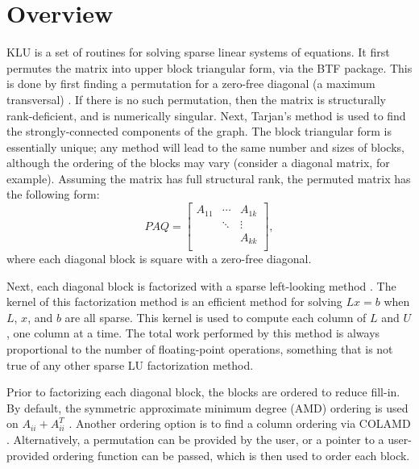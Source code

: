 \documentclass[11pt]{article}
\begin{document}
\newpage
\section{Overview}

KLU is a set of routines for solving sparse linear systems of equations.  It
first permutes the matrix into upper block triangular form, via the BTF
package.  This is done by first finding a permutation for a zero-free diagonal
(a maximum transversal) \cite{Duff81}. If there is no such permutation, then
the matrix is structurally rank-deficient, and is numerically singular.  Next,
Tarjan's method \cite{Duff78a,Tarjan72} is used to find the strongly-connected
components of the graph.  The block triangular form is essentially unique; any
method will lead to the same number and sizes of blocks, although the ordering
of the blocks may vary (consider a diagonal matrix, for example).  Assuming the
matrix has full structural rank, the permuted matrix has the following form:
\[
PAQ =
\left[
\begin{array}{ccc}
A_{11} & \cdots & A_{1k} \\
       & \ddots & \vdots \\
       &        & A_{kk} \\
\end{array}
\right],
\]
where each diagonal block is square with a zero-free diagonal.

Next, each diagonal block is factorized with a sparse left-looking method
\cite{GilbertPeierls88}.  The kernel of this factorization method is an
efficient method for solving $Lx=b$ when $L$, $x$, and $b$ are all sparse.
This kernel is used to compute each column of $L$ and $U$, one column at a time.
The total work performed by this method is always proportional to the number of
floating-point operations, something that is not true of any other sparse LU
factorization method.

Prior to factorizing each diagonal block, the blocks are ordered to reduce
fill-in.  By default, the symmetric approximate minimum degree (AMD) ordering
is used on $A_{ii}+A_{ii}^T$ \cite{AmestoyDavisDuff96,AmestoyDavisDuff03}.
Another ordering option is to find a column ordering via COLAMD
\cite{DavisGilbertLarimoreNg00_algo,DavisGilbertLarimoreNg00}.
Alternatively, a permutation can be provided by the user, or a pointer to
a user-provided ordering function can be passed, which is then used to order
each block.
\end{document}
